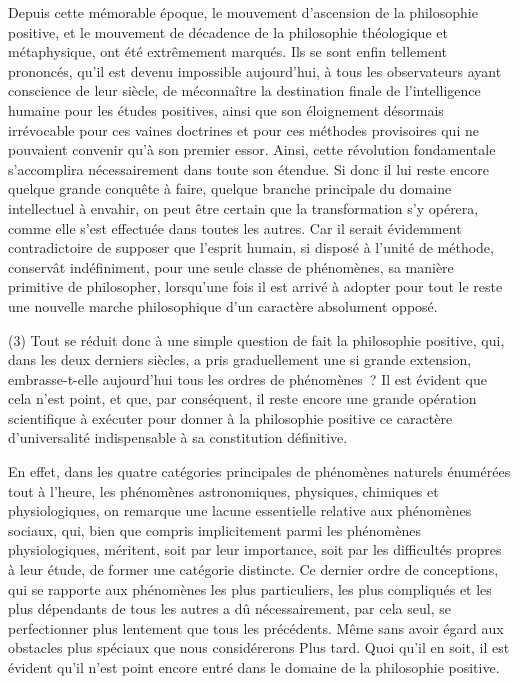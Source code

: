 \documentclass[french,twoside]{book} %
\begin{document}
Depuis cette mémorable époque, le mouvement d’ascension de la philosophie positive, et le mouvement de décadence de la philosophie théologique et métaphysique, ont été extrêmement marqués. Ils se sont enfin tellement prononcés, qu’il est devenu impossible aujourd’hui, à tous les observateurs ayant conscience de leur siècle, de méconnaître la destination finale de l’intelligence humaine pour les études positives, ainsi que son éloignement désormais irrévocable pour ces vaines doctrines et pour ces méthodes provisoires qui ne pouvaient convenir qu’à son premier essor. Ainsi, cette révolution fondamentale s’accomplira nécessairement dans toute son étendue. Si donc il lui reste encore quelque grande conquête à faire, quelque branche principale du domaine intellectuel à envahir, on peut être certain que la transformation s’y opérera, comme elle s’est effectuée dans toutes les autres. Car il serait évidemment contradictoire de supposer que l’esprit humain, si disposé à l’unité de méthode, conservât indéfiniment, pour une seule classe de phénomènes, sa manière primitive de philosopher, lorsqu’une fois il est arrivé à adopter pour tout le reste une nouvelle marche philosophique d’un caractère absolument opposé.\par
(3) Tout se réduit donc à une simple question de fait la philosophie positive, qui, dans les deux derniers siècles, a pris graduellement une si grande extension, embrasse-t-elle aujourd’hui tous les ordres de phénomènes ? Il est évident que cela n’est point, et que, par conséquent, il reste encore une grande opération scientifique à exécuter pour donner à la philosophie positive ce caractère d’universalité indispensable à sa constitution définitive.\par
En effet, dans les quatre catégories principales de phénomènes naturels énumérées tout à l’heure, les phénomènes astronomiques, physiques, chimiques et physiologiques, on remarque une lacune essentielle relative aux phénomènes sociaux, qui, bien que compris implicitement parmi les phénomènes physiologiques, méritent, soit par leur importance, soit par les difficultés propres à leur étude, de former une catégorie distincte. Ce dernier ordre de conceptions, qui se rapporte aux phénomènes les plus particuliers, les plus compliqués et les plus dépendants de tous les autres a dû nécessairement, par cela seul, se perfectionner plus lentement que tous les précédents. Même sans avoir égard aux obstacles plus spéciaux que nous considérerons Plus tard. Quoi qu’il en soit, il est évident qu’il n’est point encore entré dans le domaine de la philosophie positive.\par
\end{document}
